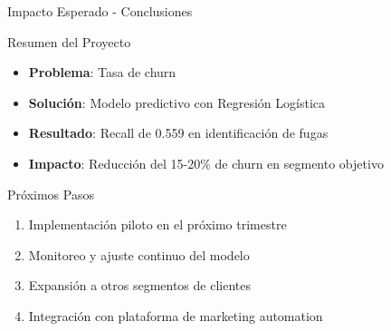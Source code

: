 \begin{frame}{Impacto Esperado - Conclusiones}
    \begin{block}{Resumen del Proyecto}
        \begin{itemize}
            \item \textbf{Problema}: Tasa de churn \churnrate
            \item \textbf{Solución}: Modelo predictivo con Regresión Logística
            \item \textbf{Resultado}: Recall de 0.559 en identificación de fugas
            \item \textbf{Impacto}: Reducción del 15-20\% de churn en segmento objetivo
        \end{itemize}
    \end{block}
    
    \vsp
    \begin{exampleblock}{Próximos Pasos}
        \begin{enumerate}
            \item Implementación piloto en el próximo trimestre
            \item Monitoreo y ajuste continuo del modelo
            \item Expansión a otros segmentos de clientes
            \item Integración con plataforma de marketing automation
        \end{enumerate}
    \end{exampleblock}
\end{frame}